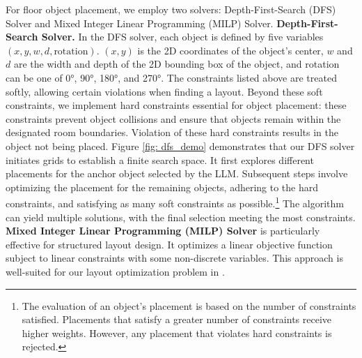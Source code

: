 For floor object placement, we employ two solvers: Depth-First-Search (DFS) Solver and Mixed Integer Linear Programming (MILP) \cite{benichou1971experiments} Solver.
\smallbreak
\noindent \textbf{Depth-First-Search Solver.} In the DFS solver, each object is defined by five variables $\left(x, y, w, d, \text{rotation}\right)$. $\left(x, y\right)$ is the 2D coordinates of the object's center, $w$ and $d$ are the width and depth of the 2D bounding box of the object, and rotation can be one of 0°, 90°, 180°, and 270°.
The constraints listed above are treated softly, allowing certain violations when finding a layout.
Beyond these soft constraints, we implement hard constraints essential for object placement: these constraints prevent object collisions and ensure that objects remain within the designated room boundaries. Violation of these hard constraints results in the object not being placed. Figure \ref{fig: dfs_demo} demonstrates that our DFS solver initiates grids to establish a finite search space. It first explores different placements for the anchor object selected by the LLM. Subsequent steps involve optimizing the placement for the remaining objects, adhering to the hard constraints, and satisfying as many soft constraints as possible.\footnote{The evaluation of an object's placement is based on the number of constraints satisfied. Placements that satisfy a greater number of constraints receive higher weights. However, any placement that violates hard constraints is rejected.} The algorithm can yield multiple solutions, with the final selection meeting the most constraints.
\smallbreak
\noindent \textbf{Mixed Integer Linear Programming (MILP) Solver} is particularly effective for structured layout design. It optimizes a linear objective function subject to linear constraints with some non-discrete variables. This approach is well-suited for our layout optimization problem in \holodeck.

